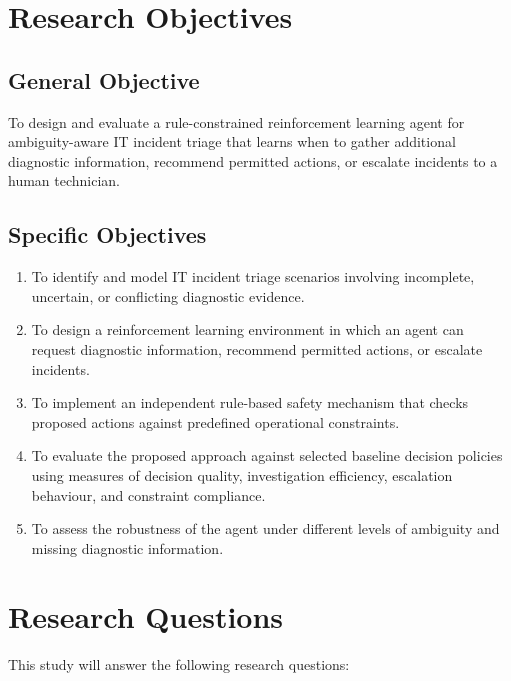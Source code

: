 \documentclass[12pt,a4paper]{article}
\begin{document}
\section{Research Objectives}

\subsection{General Objective}

To design and evaluate a rule-constrained reinforcement learning agent for ambiguity-aware IT incident triage that learns when to gather additional diagnostic information, recommend permitted actions, or escalate incidents to a human technician.

\subsection{Specific Objectives}

\begin{enumerate}
  \item To identify and model IT incident triage scenarios involving incomplete, uncertain, or conflicting diagnostic evidence.
  \item To design a reinforcement learning environment in which an agent can request diagnostic information, recommend permitted actions, or escalate incidents.
  \item To implement an independent rule-based safety mechanism that checks proposed actions against predefined operational constraints.
  \item To evaluate the proposed approach against selected baseline decision policies using measures of decision quality, investigation efficiency, escalation behaviour, and constraint compliance.
  \item To assess the robustness of the agent under different levels of ambiguity and missing diagnostic information.
\end{enumerate}

\section{Research Questions}

This study will answer the following research questions:
\end{document}
